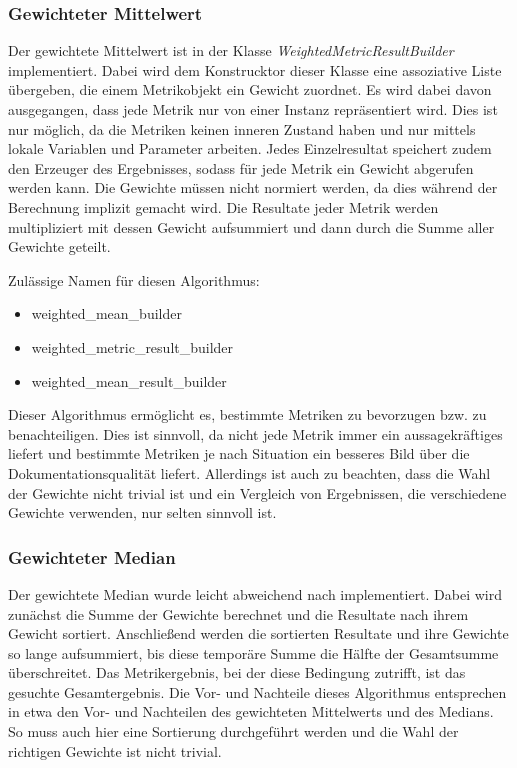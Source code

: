 \subsubsection{Gewichteter Mittelwert}
Der gewichtete Mittelwert ist in der Klasse \textit{WeightedMetricResultBuilder} implementiert. Dabei wird dem Konstrucktor dieser Klasse eine assoziative Liste übergeben, die einem Metrikobjekt ein Gewicht zuordnet.  Es wird dabei davon ausgegangen, dass jede Metrik nur von einer Instanz repräsentiert wird. Dies ist nur möglich, da die Metriken keinen inneren Zustand haben und nur mittels lokale Variablen und Parameter arbeiten. Jedes Einzelresultat speichert zudem den Erzeuger des Ergebnisses, sodass für jede Metrik ein Gewicht abgerufen werden kann. Die Gewichte müssen nicht normiert werden, da dies während der Berechnung implizit gemacht wird. Die Resultate jeder Metrik werden multipliziert mit dessen Gewicht aufsummiert und dann durch die Summe aller Gewichte geteilt. 

Zulässige Namen für diesen Algorithmus:
\begin{itemize}
\item weighted\_mean\_builder
\item weighted\_metric\_result\_builder
\item weighted\_mean\_result\_builder
\end{itemize}

Dieser Algorithmus ermöglicht es, bestimmte Metriken zu bevorzugen bzw. zu benachteiligen. Dies ist sinnvoll, da nicht jede Metrik immer ein aussagekräftiges liefert und bestimmte Metriken je nach Situation ein besseres Bild über die Dokumentationsqualität liefert. Allerdings ist auch zu beachten, dass die Wahl der Gewichte nicht trivial ist und ein Vergleich von Ergebnissen, die verschiedene Gewichte verwenden, nur selten sinnvoll ist.

\subsubsection{Gewichteter Median}
Der gewichtete Median wurde leicht abweichend nach \cite[S. 37]{YAGER199835} implementiert. Dabei wird zunächst die Summe der Gewichte berechnet und die Resultate nach ihrem Gewicht sortiert. Anschließend werden die sortierten Resultate und ihre Gewichte so lange aufsummiert, bis diese temporäre Summe die Hälfte der Gesamtsumme überschreitet. Das Metrikergebnis, bei der diese Bedingung zutrifft, ist das gesuchte Gesamtergebnis. Die Vor- und Nachteile dieses Algorithmus entsprechen in etwa den Vor- und Nachteilen des gewichteten Mittelwerts und des Medians. So muss auch hier eine Sortierung durchgeführt werden und die Wahl der richtigen Gewichte ist nicht trivial. 

